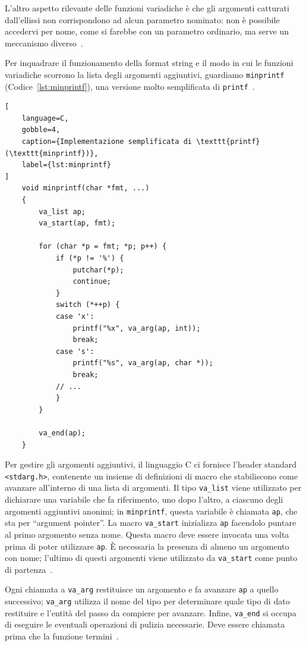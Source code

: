 L'altro aspetto rilevante delle funzioni variadiche è che gli argomenti catturati dall'ellissi non corrispondono ad alcun parametro nominato: non è possibile accedervi per nome, come si farebbe con un parametro ordinario, ma serve un meccanismo diverso~\cite{kr1988}.

Per inquadrare il funzionamento della format string e il modo in cui le funzioni variadiche scorrono la lista degli argomenti aggiuntivi, guardiamo \texttt{minprintf} (Codice~\ref{lst:minprintf}), una versione molto semplificata di \texttt{printf}~\cite{kr1988}.
\begin{lstlisting}[
    language=C,
    gobble=4,
    caption={Implementazione semplificata di \texttt{printf} (\texttt{minprintf})},
    label={lst:minprintf}
]
    void minprintf(char *fmt, ...)
    {
        va_list ap;
        va_start(ap, fmt);

        for (char *p = fmt; *p; p++) {
            if (*p != '%') {
                putchar(*p);
                continue;
            }
            switch (*++p) {
            case 'x':
                printf("%x", va_arg(ap, int));
                break;
            case 's':
                printf("%s", va_arg(ap, char *));
                break;
            // ...
            }
        }

        va_end(ap);
    }
\end{lstlisting}

Per gestire gli argomenti aggiuntivi, il linguaggio C ci fornisce l'header standard \texttt{<stdarg.h>}, contenente un insieme di definizioni di macro che stabiliscono come avanzare all'interno di una lista di argomenti.
Il tipo \texttt{va\_list} viene utilizzato per dichiarare una variabile che fa riferimento, uno dopo l'altro, a ciascuno degli argomenti aggiuntivi anonimi; in \texttt{minprintf}, questa variabile è chiamata \texttt{ap}, che sta per ``argument pointer''. La macro \texttt{va\_start} inizializza \texttt{ap} facendolo puntare al primo argomento senza nome. Questa macro deve essere invocata una volta prima di poter utilizzare \texttt{ap}. È necessaria la presenza di almeno un argomento con nome; l'ultimo di questi argomenti viene utilizzato da \texttt{va\_start} come punto di partenza~\cite{kr1988}.

Ogni chiamata a \texttt{va\_arg} restituisce un argomento e fa avanzare \texttt{ap} a quello successivo; \texttt{va\_arg} utilizza il nome del tipo per determinare quale tipo di dato restituire e l'entità del passo da compiere per avanzare. Infine, \texttt{va\_end} si occupa di eseguire le eventuali operazioni di pulizia necessarie. Deve essere chiamata prima che la funzione termini~\cite{kr1988}.

